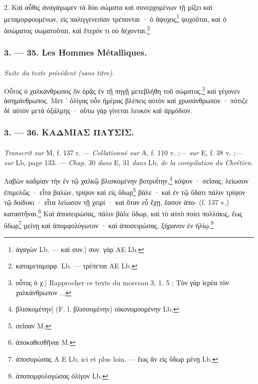 \documentclass[a4paper, 11pt, oneside, polutonikogreek, french]{article}
\begin{document}
2. Καὶ αὖθις ἀναγάγωμεν τὰ δύο σώματα καὶ συνερχομένων τῇ μίξει καὶ μεταμορφουμένων, εἰς παλιγγενεσίαν τρέπονται · ὁ ἄψυχος\footnote{ἀγαγὼν Lb. --- καὶ συν.] συν. γὰρ AE Lb.} ψυχοῦται, καὶ ὁ ἀσώματος σωματοῦται, καὶ ἕτερόν τι οὐ δέχονται.\footnote{καταμεταμορφ. Lb. --- τρέπεται AE Lb.}

\bigskip
\centerline{\EightStarTaper}
\centerline{\EightStarTaper\EightStarTaper}
\bigskip

\subsubsection{3. --- 35. Les Hommes Métalliques.}
\paragraph{}
\emph{Suite du texte précédent (sans titre).}

\bigskip

Οὖτος ὁ χαλκάνθρωπος ὃν ὁρᾷς ἐν τῇ πηγῇ μετεβλήθη τοῦ σώματος,\footnote{οὗτος ὁ χ.] Rapprocher ce texte du morceau 3, 1, 5 ; Τὸν γὰρ ἱερέα τὸν χαλκάνθρωπον ...} καὶ γέγονεν ἀσημάνθρωπος. Μετ ᾽ ὀλίγας οὖν ἡμέρας βλέπεις αὐτὸν καὶ χρυσάνθρωπον · πότιζε δὲ αὐτὸν μετὰ ὀξάλμης · οὕτω γὰρ γίνεται λευκὸν καὶ ἁρμόδιον.

\bigskip
\centerline{\EightStarTaper}
\centerline{\EightStarTaper\EightStarTaper}
\bigskip

\subsubsection{3. --- 36. ΚΑΔΜΙΑΣ ΠΛΥΣΙΣ.}
\paragraph{}
\emph{Transcrit sur} M, f. 137 r. --- \emph{Collationné sur} A, f. 110 v. ;--- \emph{sur} E, f. 38 v. ;--- \emph{sur} Lb, page 133. --- \emph{Chap.} 30 \emph{dans} E, 31 \emph{dans} Lb, \emph{de la compilation du Chrétien}.

\bigskip

Λαβὼν καδμίαν τὴν ἐν τῷ χαλκῷ βλισκομένην βοτρυΐτην,\footnote{βλισκομένην] (F. l. βλισσομένην) οἰκονομουμένην Lb.} κόψον · σεῖσας, λείωσον ἐπιμελῶς · εἶτα βαλὼν, τρίψον καὶ εἰς ὕδωρ\footnote{σεῖσαν M.} βάλε · καὶ ἐν τῷ ὕδατι πάλιν τρίψον τῷ δοίδυκι · εἶτα λείωσον τῇ χειρί · καὶ ὅταν εὖ ἔχῃ, ἔασον ἀπο- (f. 137 v.) καταστῆναι.\footnote{ἀποκαθεσθῆναι M.} Καὶ ἀποσειρώσας, πάλιν βάλε ὕδωρ, καὶ τὸ αὐτὸ ποίει πολλάκις, ἕως ὕδωρ\footnote{ἀποσυρώσας A E Lb, ici et plus loin. --- ἕως ἂν εἰς ὕδωρ μὲνῃ Lb.} μείνῃ καὶ ἀπομφολύγωτον · καὶ ἀποσειρώσας, ξήρανον ἐν ἡλίῳ.\footnote{ἀποπομφυλογώσας ὀλίγον Lb.}
\end{document}
